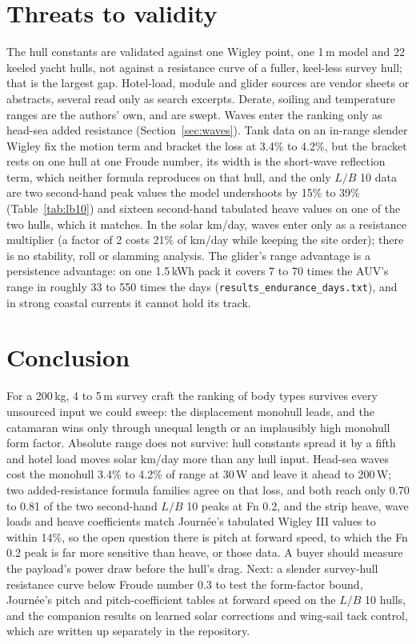 \documentclass[conference]{IEEEtran}
\begin{document}
\section{Threats to validity}
The hull constants are validated against one Wigley point, one 1\,m model and 22 keeled yacht hulls,
not against a resistance curve of a fuller, keel-less survey hull; that is the largest gap. Hotel-load,
module and glider sources are vendor sheets or abstracts, several read only as search excerpts.
Derate, soiling and temperature ranges are the authors' own, and are swept. Waves enter the ranking
only as head-sea added resistance (Section~\ref{sec:waves}). Tank data on an in-range slender Wigley
fix the motion term and bracket the loss at 3.4\% to 4.2\%, but the bracket rests on one hull at one Froude
number, its width is the short-wave reflection term, which neither formula reproduces on that hull, and the only
$L/B$ 10 data are two second-hand peak values the model undershoots by 15\% to 39\% (Table~\ref{tab:lb10}) and sixteen second-hand tabulated heave values on one of the two hulls, which it matches. In the
solar km/day, waves enter only as a resistance multiplier (a factor of 2 costs 21\% of km/day while keeping the site
order); there is no stability, roll or slamming analysis. The glider's range advantage is a persistence advantage: on
one 1.5\,kWh pack it covers 7 to 70 times the AUV's range in roughly 33 to 550 times the days
(\texttt{results\_endurance\_days.txt}), and in strong coastal currents it cannot hold its track.

\section{Conclusion}
For a 200\,kg, 4 to 5\,m survey craft the ranking of body types survives every unsourced input we
could sweep: the displacement monohull leads, and the catamaran wins only through unequal length or
an implausibly high monohull form factor. Absolute range does not survive: hull constants spread it
by a fifth and hotel load moves solar km/day more than any hull input. Head-sea waves cost the monohull 3.4\% to 4.2\% of range at 30\,W and leave it ahead to 200\,W; two added-resistance formula families agree on that loss, and both reach only 0.70 to 0.81 of the two second-hand $L/B$ 10 peaks at Fn 0.2, and the strip heave, wave loads and heave coefficients match Journ\'ee's tabulated Wigley III values to within 14\%, so the open question there is pitch at forward speed, to which the Fn 0.2 peak is far more sensitive than heave, or those data. A buyer should measure the
payload's power draw before the hull's drag. Next: a slender survey-hull resistance curve below
Froude number 0.3 to test the form-factor bound, Journ\'ee's pitch and pitch-coefficient tables at forward speed on the $L/B$ 10 hulls, and the companion results on learned solar
corrections and wing-sail tack control, which are written up separately in the repository.



\end{document}
